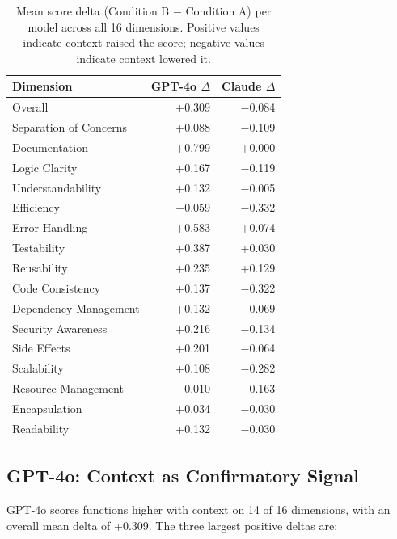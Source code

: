 \documentclass[12pt]{report}
\begin{document}
\begin{table}[htbp]
\centering
\begin{tabular}{lrr}
\toprule
\textbf{Dimension} & \textbf{GPT-4o $\Delta$} & \textbf{Claude $\Delta$} \\
\midrule
Overall                & +0.309 & $-$0.084 \\
\midrule
Separation of Concerns & +0.088 & $-$0.109 \\
Documentation          & +0.799 & +0.000 \\
Logic Clarity          & +0.167 & $-$0.119 \\
Understandability      & +0.132 & $-$0.005 \\
Efficiency             & $-$0.059 & $-$0.332 \\
Error Handling         & +0.583 & +0.074 \\
Testability            & +0.387 & +0.030 \\
Reusability            & +0.235 & +0.129 \\
Code Consistency       & +0.137 & $-$0.322 \\
Dependency Management  & +0.132 & $-$0.069 \\
Security Awareness     & +0.216 & $-$0.134 \\
Side Effects           & +0.201 & $-$0.064 \\
Scalability            & +0.108 & $-$0.282 \\
Resource Management    & $-$0.010 & $-$0.163 \\
Encapsulation          & +0.034 & $-$0.030 \\
Readability            & +0.132 & $-$0.030 \\
\bottomrule
\end{tabular}
\caption{Mean score delta (Condition B $-$ Condition A) per model across all 16 dimensions. Positive values indicate context raised the score; negative values indicate context lowered it.}
\label{tab:delta_full}
\end{table}

\subsection{GPT-4o: Context as Confirmatory Signal}

GPT-4o scores functions higher with context on 14 of 16 dimensions, with an overall mean delta of +0.309. The three largest positive deltas are:
\end{document}
